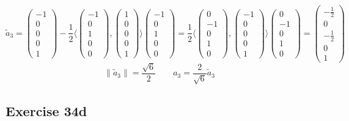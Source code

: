 \documentclass[a4paper]{article}
\theoremstyle{definition}
\newcommand\ip[2]{\langle{#1},{#2}\rangle}
\newcommand\norm[1]{\left\|{#1}\right\|}
\begin{document}
\[ \tilde a_3 = \begin{pmatrix} -1 \\ 0 \\ 0 \\ 0 \\ 1 \end{pmatrix} - \frac12 \ip{\begin{pmatrix} -1 \\ 0 \\ 1 \\ 0 \\ 0 \end{pmatrix}}{\begin{pmatrix} 1 \\ 0 \\ 0 \\ 0 \\ 1 \end{pmatrix}} \begin{pmatrix} -1 \\ 0 \\ 1 \\ 0 \\ 0 \end{pmatrix} = \frac12 \ip{\begin{pmatrix} 0 \\ -1 \\ 0 \\ 1 \\ 0 \end{pmatrix}}{\begin{pmatrix} -1 \\ 0 \\ 0 \\ 0 \\ 1 \end{pmatrix}} \begin{pmatrix} 0 \\ -1 \\ 0 \\ 1 \\ 0 \end{pmatrix} = \begin{pmatrix} -\frac12 \\ 0 \\ -\frac12 \\ 0 \\ 1 \end{pmatrix} \]
\[ \norm{\tilde a_3} = \frac{\sqrt{6}}{2} \qquad a_3 = \frac2{\sqrt{6}} \tilde a_3 \]

\subsection{Exercise 34d}
\end{document}
